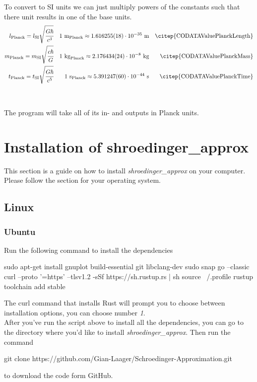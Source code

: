 \documentclass[11pt,DIV=10,final]{scrreprt} %
\begin{document}
To convert to SI units we can just multiply powers of the constants such that there unit results in one of the base units.
\begin{align*}
l_{\text{Planck}} = l_{\text{SI}} \sqrt{\cfrac{G \hbar}{c^{3}}}  && 1~\text{m}_{\text{Planck}}  \approx 1.616255(18) \cdot 10^{-35}~\text{m}  && \text{\citep{CODATAValuePlanckLength}} \\
m_{\text{Planck}} = m_{\text{SI}} \sqrt{\cfrac{c \hbar}{G}}      && 1~\text{kg}_{\text{Planck}} \approx  2.176434(24) \cdot 10^{-8}~\text{kg} && \text{\citep{CODATAValuePlanckMass}} \\
t_{\text{Planck}} = t_{\text{SI}} \sqrt{\cfrac{G \hbar}{c^{5}}} && 1~\text{s}_{\text{Planck}}  \approx 5.391247(60) \cdot 10^{-44}~\text{s}  && \text{\citep{CODATAValuePlanckTime}}
\end{align*}
\hspace*{\fill}~\citep[Table 1]{gaarder2016gravitational} \\
\\
The program will take all of its in- and outputs in Planck units.

\section{Installation of shroedinger\_approx}
This section is a guide on how to install \emph{shroedinger\_approx} on your computer. Please follow the section for your operating system.
\subsection{Linux}
\subsubsection{Ubuntu}
Run the following command to install the dependencies
\begin{bashcode}
sudo apt-get install gnuplot build-essential git libclang-dev
sudo snap go --classic
curl --proto '=https' --tlsv1.2 -sSf https://sh.rustup.rs | sh
source ~/.profile
rustup toolchain add stable
\end{bashcode}
The curl command that installs Rust will prompt you to choose between installation options, you can choose number \emph{1}.
\\[3ex]
After you've run the script above to install all the dependencies, you can go to the directory where you'd like to install \emph{shroedinger\_approx}. Then run the command
\begin{bashcode}
git clone https://github.com/Gian-Laager/Schroedinger-Approximation.git
\end{bashcode}
to download the code form GitHub.
\end{document}
